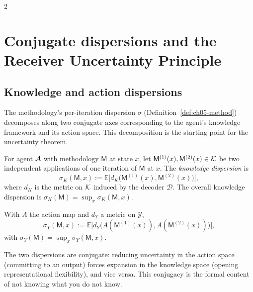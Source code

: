 \begin{multicols}{2}

\section{Conjugate dispersions and the Receiver Uncertainty Principle}
\label{sec:ch05-dispersions}

\subsection{Knowledge and action dispersions}

The methodology's per-iteration dispersion $\sigma$ (Definition~\ref{def:ch05-method})
decomposes along two conjugate axes corresponding to the agent's knowledge framework and
its action space. This decomposition is the starting point for the uncertainty theorem.

\begin{definition}\label{def:ch05-dispK}
For agent $\mathcal{A}$ with methodology $\mathsf{M}$ at state $x$, let
$\mathsf{M}^{(1)}(x), \mathsf{M}^{(2)}(x) \in \mathcal{K}$ be two independent applications
of one iteration of $\mathsf{M}$ at $x$. The \emph{knowledge dispersion} is
\[
\sigma_K(\mathsf{M}, x) :=
  \mathbb{E}\bigl[d_K\bigl(\mathsf{M}^{(1)}(x), \mathsf{M}^{(2)}(x)\bigr)\bigr],
\]
where $d_K$ is the metric on $\mathcal{K}$ induced by the decoder $\mathcal{D}$. The overall
knowledge dispersion is $\sigma_K(\mathsf{M}) = \sup_x \sigma_K(\mathsf{M}, x)$.
\end{definition}

\begin{definition}\label{def:ch05-dispY}
With $A$ the action map and $d_Y$ a metric on $\mathcal{Y}$,
\[
\sigma_Y(\mathsf{M}, x) :=
  \mathbb{E}\bigl[d_Y\bigl(A(\mathsf{M}^{(1)}(x)),
  A(\mathsf{M}^{(2)}(x))\bigr)\bigr],
\]
with $\sigma_Y(\mathsf{M}) = \sup_x \sigma_Y(\mathsf{M}, x)$.
\end{definition}

The two dispersions are conjugate: reducing uncertainty in the action space (committing
to an output) forces expansion in the knowledge space (opening representational
flexibility), and vice versa. This conjugacy is the formal content of not knowing what
you do not know.


\end{multicols}
